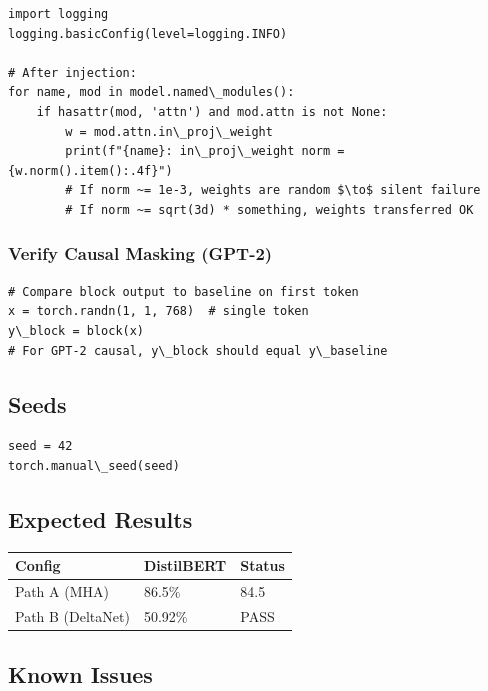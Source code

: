 \begin{lstlisting}
import logging
logging.basicConfig(level=logging.INFO)

# After injection:
for name, mod in model.named\_modules():
    if hasattr(mod, 'attn') and mod.attn is not None:
        w = mod.attn.in\_proj\_weight
        print(f"{name}: in\_proj\_weight norm = {w.norm().item():.4f}")
        # If norm ~= 1e-3, weights are random $\to$ silent failure
        # If norm ~= sqrt(3d) * something, weights transferred OK
\end{lstlisting}

\subsubsection{Verify Causal Masking (GPT-2)}

\begin{lstlisting}
# Compare block output to baseline on first token
x = torch.randn(1, 1, 768)  # single token
y\_block = block(x)
# For GPT-2 causal, y\_block should equal y\_baseline
\end{lstlisting}

\subsection{Seeds}

\begin{lstlisting}
seed = 42
torch.manual\_seed(seed)
\end{lstlisting}

\subsection{Expected Results}

\begin{table}[H]
\centering
\small
\begin{tabular}{lll}
\toprule
\textbf{Config} & \textbf{DistilBERT} & \textbf{Status} \\
\midrule
Path A (MHA) & 86.5\% & 84.5 \\
Path B (DeltaNet) & 50.92\% & PASS \\
\bottomrule
\end{tabular}
\end{table}

\subsection{Known Issues}

